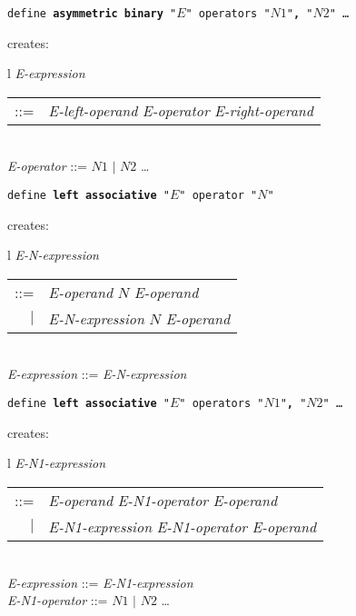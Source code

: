 \documentclass[12pt]{article}
\newcommand{\TT}[1]{{\tt \bfseries #1}}
\newenvironment{indpar}[1][0.3in]%
	{\begin{list}{}%
		     {\setlength{\itemsep}{0in}%
		      \setlength{\topsep}{0in}%
		      \setlength{\parsep}{1ex}%
		      \setlength{\labelwidth}{#1}%
		      \setlength{\leftmargin}{#1}%
		      \addtolength{\leftmargin}{\labelsep}}%
	 \item}%
	{\end{list}}
\begin{document}
\begin{indpar}
{\tt define \TT{asymmetric binary} "$E$" operators "$N1$"\TT{,} "$N2$" \ldots}
\begin{indpar}
creates: \begin{tabular}[t]{l}
         {\em E-expression} \begin{tabular}[t]{rl}
                            ::= & {\em E-left-operand} {\em E-operator}
			          {\em E-right-operand} \\
                            \end{tabular} \\
         {\em E-operator} ::= $N1$ $|$ $N2$ \ldots \\
	 \end{tabular}
\end{indpar}

{\tt define \TT{left associative} "$E$" operator "$N$"}
\begin{indpar}
creates: \begin{tabular}[t]{l}
         {\em E-N-expression} \begin{tabular}[t]{rl}
                            ::= & {\em E-operand} $N$ {\em E-operand} \\
                            $|$ & {\em E-N-expression} $N$ {\em E-operand} \\
                            \end{tabular} \\
         {\em E-expression} ::= {\em E-N-expression} \\
	 \end{tabular}
\end{indpar}

{\tt define \TT{left associative} "$E$" operators "$N1$"\TT{,} "$N2$" \ldots}
\begin{indpar}
creates: \begin{tabular}[t]{l}
         {\em E-N1-expression} \begin{tabular}[t]{rl}
                            ::= & {\em E-operand} {\em E-N1-operator}
			          {\em E-operand} \\
                            $|$ & {\em E-N1-expression} {\em E-N1-operator}
			          {\em E-operand} \\
                            \end{tabular} \\
         {\em E-expression} ::= {\em E-N1-expression} \\
         {\em E-N1-operator} ::= $N1$ $|$ $N2$ \ldots \\
	 \end{tabular}
\end{indpar}


\end{indpar}
\end{document}
